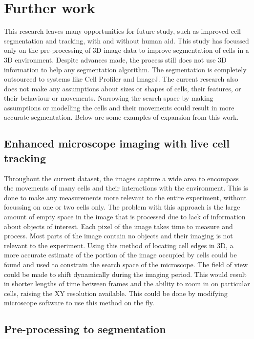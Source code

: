 \section{Further work}

This research leaves many opportunities for future study, such as improved cell segmentation and tracking, with and without human aid. This study has focussed only on the pre-processing of 3D image data to improve segmentation of cells in a 3D environment. Despite advances made, the process still does not use 3D information to help any segmentation algorithm. The segmentation is completely outsourced to systems like Cell Profiler and ImageJ. The current research also does not make any assumptions about sizes or shapes of cells, their features, or their behaviour or movements. Narrowing the search space by making assumptions or modelling the cells and their movements could result in more accurate segmentation. Below are some examples of expansion from this work.

\subsection{Enhanced microscope imaging with live cell tracking}

Throughout the current dataset, the images capture a wide area to encompass the movements of many cells and their interactions with the environment. This is done to make any measurements more relevant to the entire experiment, without focussing on one or two cells only. The problem with this approach is the large amount of empty space in the image that is processed due to lack of information about objects of interest. Each pixel of the image takes time to measure and process. Most parts of the image contain no objects and their imaging is not relevant to the experiment. Using this method of locating cell edges in 3D, a more accurate estimate of the portion of the image occupied by cells could be found and used to constrain the search space of the microscope. The field of view could be made to shift dynamically during the imaging period. This would result in shorter lengths of time between frames and the ability to zoom in on particular cells, raising the XY resolution available. This could be done by modifying microscope software to use this method on the fly.

\subsection{Pre-processing to segmentation}

